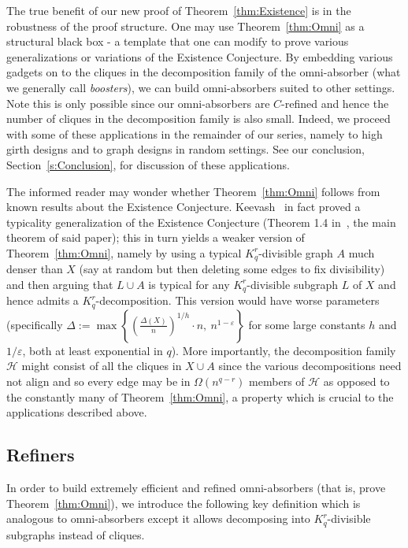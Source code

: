 \documentclass[11pt]{article}
\newcounter{i}
\theoremstyle{plain}
\theoremstyle{plain} %
\theoremstyle{definition}
\begin{document}
The true benefit of our new proof of Theorem~\ref{thm:Existence} is in the robustness of the proof structure. One may use Theorem~\ref{thm:Omni} as a structural black box - a template that one can modify to prove various generalizations or variations of the Existence Conjecture. By embedding various gadgets on to the cliques in the decomposition family of the omni-absorber (what we generally call \emph{boosters}), we can build omni-absorbers suited to other settings. Note this is only possible since our omni-absorbers are $C$-refined and hence the number of cliques in the decomposition family is also small. Indeed, we proceed with some of these applications in the remainder of our series, namely to high girth designs and to graph designs in random settings. See our conclusion, Section~\ref{s:Conclusion}, for discussion of these applications.

The informed reader may wonder whether Theorem~\ref{thm:Omni} follows from known results about the Existence Conjecture. Keevash~\cite{K14} in fact proved a typicality generalization of the Existence Conjecture (Theorem 1.4 in~\cite{K14}, the main theorem of said paper); this in turn yields a weaker version of Theorem~\ref{thm:Omni}, namely by using a typical $K_q^r$-divisible graph $A$ much denser than $X$ (say at random but then deleting some edges to fix divisibility) and then arguing that $L\cup A$ is typical for any $K_q^r$-divisible subgraph $L$ of $X$ and hence admits a $K_q^r$-decomposition. This version would have worse parameters (specifically $\Delta := \max \left\{ \left(\frac{\Delta(X)}{n}\right)^{1/h}\cdot n,~n^{1-\varepsilon} \right\}$ for some large constants $h$ and $1/\varepsilon$, both at least exponential in $q$). More importantly, the decomposition family $\mathcal{H}$ might consist of all the cliques in $X\cup A$ since the various decompositions need not align and so every edge may be in $\Omega(n^{q-r})$ members of $\mathcal{H}$ as opposed to the constantly many of Theorem~\ref{thm:Omni}, a property which is crucial to the applications described above. 

\subsection{Refiners}\label{ss:Refiner}

In order to build extremely efficient and refined omni-absorbers (that is, prove Theorem~\ref{thm:Omni}), we introduce the following key definition which is analogous to omni-absorbers except it allows decomposing into $K_q^r$-divisible subgraphs instead of cliques.
\end{document}
